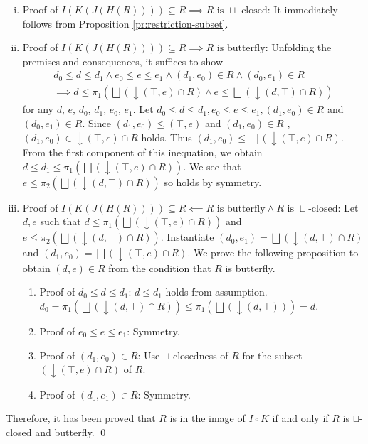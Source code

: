 \documentclass{llncs}
\newcommand{\join}{\sqcup}
\newcommand{\bigjoin}{\bigsqcup}
\newcommand{\comp}{\circ}
\begin{document}
\begin{enumerate}[i.]
  \item{Proof of $I(K(J(H(R)))) \subseteq R \implies R \text{ is } \join \text{-closed}$:}
    It immediately follows from Proposition \ref{pr:restriction-subset}.
  \item{Proof of $I(K(J(H(R)))) \subseteq R \implies R \text{ is butterfly}$:}
    Unfolding the premises and consequences, it suffices to show
    \begin{align*}
       d_{0} \leq d \leq d_{1} \land e_{0} \leq e \leq e_{1} \land (d_{1}, e_{0}) \in R \land (d_{0}, e_{1}) \in R \\
       \implies d \leq \pi_{1} (\bigjoin(\downarrow (\top , e) \cap R) \land e \leq \bigjoin(\downarrow (d , \top) \cap R))
    \end{align*}
    for any $d$, $e$, $d_{0}$, $d_{1}$, $e_{0}$, $e_{1}$.
    Let $d_{0} \leq d \leq d_{1}, e_{0} \leq e \leq e_{1}, (d_{1}, e_{0}) \in R$ and $(d_{0}, e_{1}) \in R$.
    Since $(d_{1} , e_{0}) \leq (\top , e)$ and $(d_{1} , e_{0}) \in R$ , $(d_{1} , e_{0}) \in \downarrow (\top , e) \cap R$ holds. Thus $(d_{1}, e_{0}) \leq \bigjoin(\downarrow (\top , e) \cap R)$. From the first component of this inequation, we obtain $d \leq d_{1} \leq \pi_{1} (\bigjoin(\downarrow (\top , e) \cap R))$. We see that $e \leq \pi_{2} (\bigjoin(\downarrow (d , \top) \cap R))$ so holds by symmetry.
  \item{Proof of $I(K(J(H(R)))) \subseteq R \impliedby R \text{ is butterfly} \land R \text{ is } \join \text{-closed}$:}
        Let $d, e$ such that $d \leq \pi_{1} (\bigjoin(\downarrow (\top , e) \cap R))$ and $e \leq \pi_{2} (\bigjoin(\downarrow (d , \top) \cap R))$.
        Instantiate $(d_{0}, e_{1}) = \bigjoin(\downarrow (d , \top) \cap R)$ and $(d_{1}, e_{0}) = \bigjoin(\downarrow (\top , e) \cap R)$. We prove the following proposition to obtain $(d , e) \in R$ from the condition that $R$ is butterfly.
        \begin{enumerate}[]
          \item{Proof of $d_{0} \leq d \leq d_{1}$:} $d \leq d_{1}$ holds from assumption. $d_{0} = \pi_{1} (\bigjoin(\downarrow (d , \top) \cap R)) \leq \pi_{1} (\bigjoin(\downarrow (d , \top))) = d$.
          \item{Proof of $e_{0} \leq e \leq e_{1}$:} Symmetry.
          \item{Proof of $(d_{1}, e_{0}) \in R$:} Use $\join$-closedness of $R$ for the subset $(\downarrow (\top , e) \cap R)$ of $R$.
          \item{Proof of $(d_{0}, e_{1}) \in R$:} Symmetry.
        \end{enumerate}
\end{enumerate}
Therefore, it has been proved that $R$ is in the image of $I \comp K$ if and only if $R$ is $\join$-closed and butterfly. \qed
\end{document}
